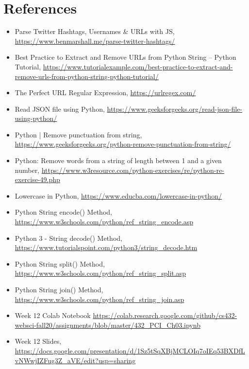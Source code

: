 \documentclass[12pt]{article}
\begin{document}
\section*{References}


\begin{itemize}
    \item {Parse Twitter Hashtags, Usernames \& URLs with JS, \url{https://www.benmarshall.me/parse-twitter-hashtags/}}
    \item {Best Practice to Extract and Remove URLs from Python String – Python Tutorial, \url{https://www.tutorialexample.com/best-practice-to-extract-and-remove-urls-from-python-string-python-tutorial/}}
    \item {The Perfect URL Regular Expression, \url{https://urlregex.com/}}
    \item {Read JSON file using Python, \url{https://www.geeksforgeeks.org/read-json-file-using-python/}}
    \item {Python | Remove punctuation from string, \url{https://www.geeksforgeeks.org/python-remove-punctuation-from-string/}}
    \item {Python: Remove words from a string of length between 1 and a given number, \url{https://www.w3resource.com/python-exercises/re/python-re-exercise-49.php}}
    \item {Lowercase in Python, \url{https://www.educba.com/lowercase-in-python/}}
    \item {Python String encode() Method, \url{https://www.w3schools.com/python/ref_string_encode.asp}}
    \item {Python 3 - String decode() Method, \url{https://www.tutorialspoint.com/python3/string_decode.htm}}
    \item {Python String split() Method, \url{https://www.w3schools.com/python/ref_string_split.asp}}
    \item {Python String join() Method, \url{https://www.w3schools.com/python/ref_string_join.asp}}
    \item {Week 12 Colab Notebook \url{https://colab.research.google.com/github/cs432-websci-fall20/assignments/blob/master/432_PCI_Ch03.ipynb}}
    \item {Week 12 Slides, \url{https://docs.google.com/presentation/d/1Sz5tSqXBjMCLOIq7oIEq53BXDfLvNWwjIZFug3Z_aVE/edit?usp=sharing}}
\end{itemize}
\end{document}
